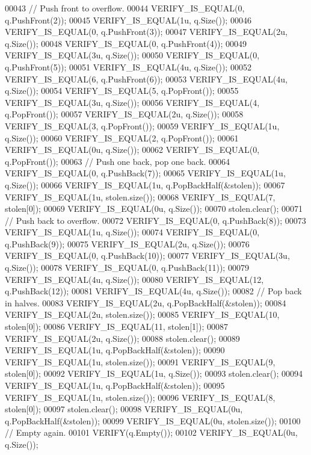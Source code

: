 \begin{DoxyCode}
00043   \textcolor{comment}{// Push front to overflow.}
00044   VERIFY\_IS\_EQUAL(0, q.PushFront(2));
00045   VERIFY\_IS\_EQUAL(1u, q.Size());
00046   VERIFY\_IS\_EQUAL(0, q.PushFront(3));
00047   VERIFY\_IS\_EQUAL(2u, q.Size());
00048   VERIFY\_IS\_EQUAL(0, q.PushFront(4));
00049   VERIFY\_IS\_EQUAL(3u, q.Size());
00050   VERIFY\_IS\_EQUAL(0, q.PushFront(5));
00051   VERIFY\_IS\_EQUAL(4u, q.Size());
00052   VERIFY\_IS\_EQUAL(6, q.PushFront(6));
00053   VERIFY\_IS\_EQUAL(4u, q.Size());
00054   VERIFY\_IS\_EQUAL(5, q.PopFront());
00055   VERIFY\_IS\_EQUAL(3u, q.Size());
00056   VERIFY\_IS\_EQUAL(4, q.PopFront());
00057   VERIFY\_IS\_EQUAL(2u, q.Size());
00058   VERIFY\_IS\_EQUAL(3, q.PopFront());
00059   VERIFY\_IS\_EQUAL(1u, q.Size());
00060   VERIFY\_IS\_EQUAL(2, q.PopFront());
00061   VERIFY\_IS\_EQUAL(0u, q.Size());
00062   VERIFY\_IS\_EQUAL(0, q.PopFront());
00063   \textcolor{comment}{// Push one back, pop one back.}
00064   VERIFY\_IS\_EQUAL(0, q.PushBack(7));
00065   VERIFY\_IS\_EQUAL(1u, q.Size());
00066   VERIFY\_IS\_EQUAL(1u, q.PopBackHalf(&stolen));
00067   VERIFY\_IS\_EQUAL(1u, stolen.size());
00068   VERIFY\_IS\_EQUAL(7, stolen[0]);
00069   VERIFY\_IS\_EQUAL(0u, q.Size());
00070   stolen.clear();
00071   \textcolor{comment}{// Push back to overflow.}
00072   VERIFY\_IS\_EQUAL(0, q.PushBack(8));
00073   VERIFY\_IS\_EQUAL(1u, q.Size());
00074   VERIFY\_IS\_EQUAL(0, q.PushBack(9));
00075   VERIFY\_IS\_EQUAL(2u, q.Size());
00076   VERIFY\_IS\_EQUAL(0, q.PushBack(10));
00077   VERIFY\_IS\_EQUAL(3u, q.Size());
00078   VERIFY\_IS\_EQUAL(0, q.PushBack(11));
00079   VERIFY\_IS\_EQUAL(4u, q.Size());
00080   VERIFY\_IS\_EQUAL(12, q.PushBack(12));
00081   VERIFY\_IS\_EQUAL(4u, q.Size());
00082   \textcolor{comment}{// Pop back in halves.}
00083   VERIFY\_IS\_EQUAL(2u, q.PopBackHalf(&stolen));
00084   VERIFY\_IS\_EQUAL(2u, stolen.size());
00085   VERIFY\_IS\_EQUAL(10, stolen[0]);
00086   VERIFY\_IS\_EQUAL(11, stolen[1]);
00087   VERIFY\_IS\_EQUAL(2u, q.Size());
00088   stolen.clear();
00089   VERIFY\_IS\_EQUAL(1u, q.PopBackHalf(&stolen));
00090   VERIFY\_IS\_EQUAL(1u, stolen.size());
00091   VERIFY\_IS\_EQUAL(9, stolen[0]);
00092   VERIFY\_IS\_EQUAL(1u, q.Size());
00093   stolen.clear();
00094   VERIFY\_IS\_EQUAL(1u, q.PopBackHalf(&stolen));
00095   VERIFY\_IS\_EQUAL(1u, stolen.size());
00096   VERIFY\_IS\_EQUAL(8, stolen[0]);
00097   stolen.clear();
00098   VERIFY\_IS\_EQUAL(0u, q.PopBackHalf(&stolen));
00099   VERIFY\_IS\_EQUAL(0u, stolen.size());
00100   \textcolor{comment}{// Empty again.}
00101   VERIFY(q.Empty());
00102   VERIFY\_IS\_EQUAL(0u, q.Size());

\end{DoxyCode}
